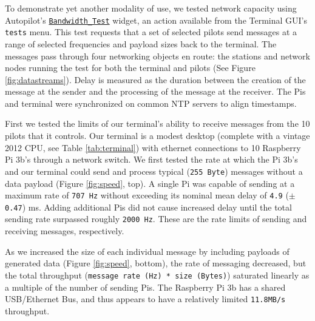 To demonstrate yet another modality of use, we tested network capacity using Autopilot's \href{http://docs.auto-pi-lot.com/autopilot.core.gui.html#autopilot.core.gui.Bandwidth_Test}{\texttt{Bandwidth\_Test}} widget, an action available from the Terminal GUI's \texttt{tests} menu. This test requests that a set of selected pilots send messages at a range of selected frequencies and payload sizes back to the terminal. The messages pass through four networking objects en route: the stations and network nodes running the test for both the terminal and pilots (See Figure \ref{fig:datastreams}). Delay is measured as the duration between the creation of the message at the sender and the processing of the message at the receiver. The Pis and terminal were synchronized on common NTP servers to align timestamps. 

First we tested the limits of our terminal's ability to receive messages from the 10 pilots that it controls. Our terminal is a modest desktop (complete with a vintage 2012 CPU, see Table \ref{tab:terminal}) with ethernet connections to 10 Raspberry Pi 3b's through a network switch. We first tested the rate at which the Pi 3b's and our terminal could send and process typical (\texttt{255 Byte}) messages without a data payload (Figure \ref{fig:speed}, top). A single Pi was capable of sending at a maximum rate of \texttt{707 Hz} without exceeding its nominal mean delay of \texttt{4.9} ($\pm$ \texttt{0.47}) ms. Adding additional Pis did not cause increased delay until the total sending rate surpassed roughly \texttt{2000 Hz}. These are the rate limits of sending and receiving messages, respectively.

As we increased the size of each individual message by including payloads of generated data (Figure \ref{fig:speed}, bottom), the rate of messaging decreased, but the total throughput (\texttt{message rate (Hz) * size (Bytes)}) saturated linearly as a multiple of the number of sending Pis. The Raspberry Pi 3b has a shared USB/Ethernet Bus, and thus appears to have a relatively limited \texttt{11.8MB/s} throughput.

